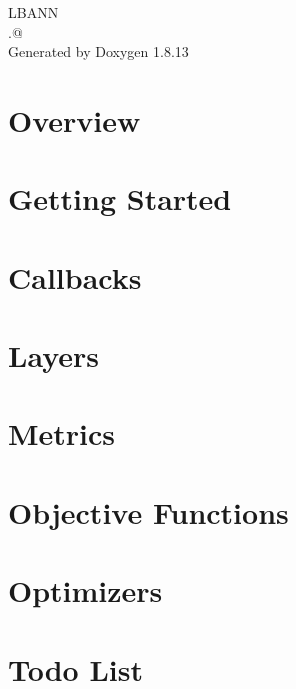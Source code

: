 \documentclass[twoside]{book}
\newcommand{\+}{\discretionary{\mbox{\scriptsize$\hookleftarrow$}}{}{}}
\newcommand{\clearemptydoublepage}{%
  \newpage{\pagestyle{empty}\cleardoublepage}%
}
\begin{document}
\hypersetup{pageanchor=false,
             bookmarksnumbered=true,
             pdfencoding=unicode
            }
\begin{titlepage}
\vspace*{7cm}
\begin{center}%
{\Large L\+B\+A\+NN \\[1ex]\large .@ }\\
\vspace*{1cm}
{\large Generated by Doxygen 1.8.13}\\
\end{center}
\end{titlepage}
\clearemptydoublepage
{}
\tableofcontents
\clearemptydoublepage
{}
\hypersetup{pageanchor=true}

\chapter{Overview}
\label{index}\hypertarget{index}{}
\chapter{Getting Started}
\label{getting_started}

\chapter{Callbacks}
\label{callbacks}

\chapter{Layers}
\label{layers}

\chapter{Metrics}
\label{metrics}

\chapter{Objective Functions}
\label{obj_fn}

\chapter{Optimizers}
\label{optimizers}

\chapter{Todo List}
\label{todo}

\end{document}
